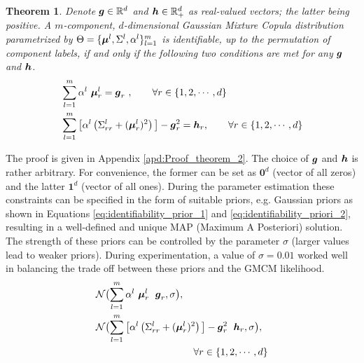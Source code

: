 \documentclass{article}
\theoremstyle{plain}
\newtheorem{theorem}{Theorem}[section]
\theoremstyle{definition}
\theoremstyle{remark}
\begin{document}
\begin{theorem}
\label{thm:theorem2} 
Denote $\boldsymbol{g}\in \mathbb{R}^d$ and $\boldsymbol{h}\in \mathbb{R}_+^d$ as real-valued vectors; the latter being positive. A $m$-component, $d$-dimensional Gaussian Mixture Copula distribution parametrized by $\Theta = \{\boldsymbol{\mu}^l, \Sigma^l, \alpha^l\}_{l=1}^m$ is identifiable, up to the permutation of component labels, if and only if the following two conditions are met for any $\boldsymbol{g}$ and $\boldsymbol{h}$.
\begin{align}
&\sum_{l=1}^m \alpha^l \ \boldsymbol{\mu}_r^l=\boldsymbol{g}_r \ ,\qquad \forall r \in \{1,2,\cdots,d\} \label{eq:identifiability_constraint_1} \\
&\sum_{l=1}^m \big[ \alpha^l \left(\Sigma_{rr}^l+(\boldsymbol{\mu}_r^l)^2\right)\big] -\boldsymbol{g}_r^2 =\boldsymbol{h}_r ,\qquad \forall r \in \{1,2,\cdots,d\}\label{eq:identifiability_constraint_2}
\end{align}
\end{theorem}
The proof is given in Appendix \ref{apd:Proof_theorem_2}. The choice of $\boldsymbol{g}$ and $\boldsymbol{h}$ is rather arbitrary. For convenience, the former can be set as $\mathbf{0}^d$ (vector of all zeros) and the latter $\mathbf{1}^d$ (vector of all ones). During the parameter estimation these constraints can be specified in the form of suitable priors, e.g. Gaussian priors as shown in Equations \eqref{eq:identifiability_prior_1} and \eqref{eq:identifiability_priori_2}, resulting in a well-defined and unique MAP (Maximum A Posteriori) solution. The strength of these priors can be controlled by the parameter $\sigma$ (larger values lead to weaker priors). During experimentation, a value of $\sigma=0.01$ worked well in balancing the trade off between these priors and the GMCM likelihood.
\begin{align}
& \mathcal{N}\bigl(\sum_{l=1}^m \alpha^l \ \bs{\mu}_r^l \;\ \bs{g}_r,\sigma \bigr),  \label{eq:identifiability_prior_1} \\
&\mathcal{N}\bigl(\sum_{l=1}^m \big[ \alpha^l \left(\Sigma_{rr}^l+(\bs{\mu}_r^l)^2\right)\big] -\bs{g}_r^2 \; \ \bs{h}_r, \sigma \bigr), \label{eq:identifiability_priori_2}\\
&\qquad \qquad \qquad \qquad \qquad \forall r \in \{1,2,\cdots,d\} \nonumber
\end{align}
\end{document}
